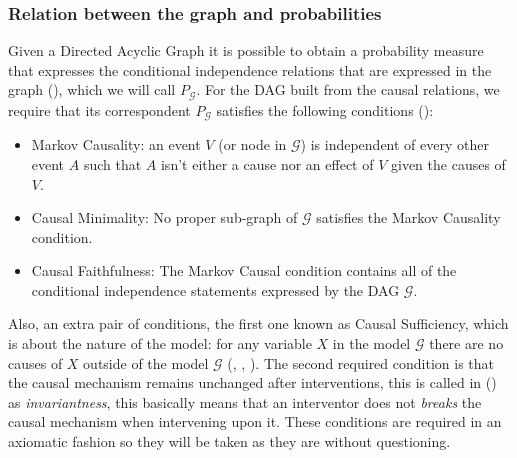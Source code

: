 \documentclass[english,letterpaper,12pt,final]{article}
\theoremstyle{definition}
\begin{document}
	\subsubsection{Relation between the graph and probabilities}
	Given a Directed Acyclic Graph it is possible to obtain a probability measure that expresses the conditional independence relations that are expressed in the graph (\cite{koller2009probabilistic}), which we will call $P_\mathcal{G}$. For the DAG built from the causal relations, we require that its correspondent $P_\mathcal{G}$ satisfies the following conditions (\cite{spirtes2000causation}):
	\begin{itemize}
	\item Markov Causality: an event $V$ (or node in $\mathcal{G}$) is independent of every other event $A$ such that $A$ isn't either a cause nor an effect of $V$ given the causes of $V$.
	\item Causal Minimality: No proper sub-graph of $\mathcal{G}$ satisfies the Markov Causality condition.
	\item Causal Faithfulness: The Markov Causal condition contains all of the conditional independence statements expressed by the DAG $\mathcal{G}$.
	\end{itemize}
	Also, an extra pair of conditions, the first one known as Causal Sufficiency, which is about the nature of the model: for any variable $X$ in the model $\mathcal{G}$ there are no causes of $X$ outside of the model $\mathcal{G}$ (\cite{spirtes2000causation}, \cite{pearl2009causality}, \cite{sucar2015probabilistic}). The second required condition is that the causal mechanism remains unchanged after interventions, this is called in (\cite{woodward2005making}) as \textit{invariantness}, this basically means that an interventor does not \textit{breaks} the causal mechanism when intervening upon it.
	These conditions are required in an axiomatic fashion so they will be taken as they are without questioning.
\end{document}
